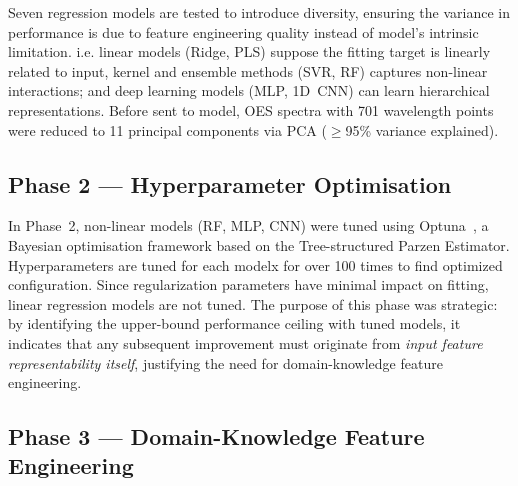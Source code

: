 \documentclass[12pt, a4paper]{article}
\begin{document}
Seven regression models are tested to introduce diversity, ensuring the variance in performance is due to feature engineering quality instead of model's intrinsic limitation. i.e. linear models (Ridge, PLS) suppose the fitting target is linearly related to input, kernel and ensemble methods (SVR, RF) captures non-linear interactions; and deep learning models (MLP, 1D~CNN) can learn hierarchical representations. Before sent to model, OES spectra with 701 wavelength points were reduced to 11 principal components via PCA ($\geq$95\% variance explained).

\subsection{Phase 2 --- Hyperparameter Optimisation}


In Phase~2, non-linear models (RF, MLP, CNN) were tuned using Optuna~\cite{optuna2019}, a Bayesian optimisation framework based on the Tree-structured Parzen Estimator. Hyperparameters are tuned for each modelx for over 100 times to find optimized configuration. Since regularization parameters have minimal impact on fitting, linear regression models are not tuned. The purpose of this phase was strategic: by identifying the upper-bound performance ceiling with tuned models, it indicates that any subsequent improvement must originate from \emph{input feature representability itself}, justifying the need for domain-knowledge feature engineering.

\subsection{Phase 3 --- Domain-Knowledge Feature Engineering}
\end{document}

